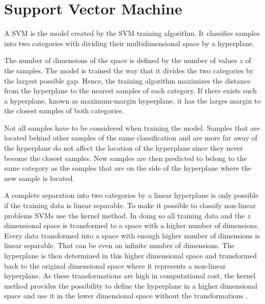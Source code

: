 
\section{Support Vector Machine}
\label{sec:svm}

A \acf{SVM} is the model created by the \ac{SVM} training algorithm.
It classifies samples into two categories with dividing their multidimensional space by a hyperplane. %

The number of dimensions of the space is defined by the number of values $z$ of the samples.
The model is trained the way that it divides the two categories by the largest possible gap. %
Hence, the training algorithm maximizes the distance from the hyperplane to the nearest samples of each category.
If there exists such a hyperplane, known as maximum-margin hyperplane, it has the larges margin to the closest samples of both categories. %

Not all samples have to be considered when training the model.
Samples that are located behind other samples of the same classification and are more far away of the hyperplane do not affect the location of the hyperplane since they never become the closest samples. %
New samples are then predicted to belong to the same category as the samples that are on the side of the hyperplane where the new sample is located.

A complete separation into two categories by a linear hyperplane is only possible if the training data is linear separable.
To make it possible to classify non-linear problems \acp{SVM} use the kernel method. %
In doing so all training data and the $z$ dimensional space is transformed to a space with a higher number of dimensions.
Every data transformed into a space with enough higher number of dimensions is linear separable.
That can be even an infinite number of dimensions. %
The hyperplane is then determined in this higher dimensional space and transformed back to the original dimensional space where it represents a non-linear hyperplane. %
As these transformations are high in computational cost, the kernel method provides the possibility to define the hyperplane in a higher dimensional space and use it in the lower dimensional space without the transformations \cite{Wikipedia2016SupportMachine}.


